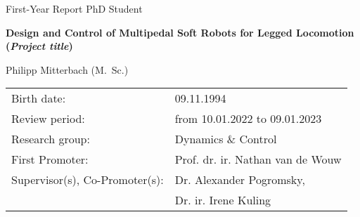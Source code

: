 \tikzexternaldisable
{}	
\tikzexternalenable


\vspace*{20mm}

\sffamily


\begin{center}
    \LARGE
    First-Year Report PhD Student \\
\end{center}

\vspace{15mm}

\begin{center}
    \LARGE
    \bfseries
    Design and Control of Multipedal Soft Robots for Legged Locomotion \\
    \mdseries 
    (\textit{Project title})
\end{center}

\vspace{3mm}

%	

\vspace{15mm}

\mdseries
\LARGE
\begin{center}  
Philipp Mitterbach (M.~Sc.)

\end{center}

\vspace{15mm}

\large
\noindent
\begin{tabular}{l l}
  Birth date: & 09.11.1994 \\
  Review period:  & from 10.01.2022 to 09.01.2023 \\
  Research group: & Dynamics \& Control \\
  First Promoter: & Prof. dr. ir. Nathan van de Wouw \\
  Supervisor(s), Co-Promoter(s):
  & Dr. Alexander Pogromsky, \\ & Dr. ir. Irene Kuling  \\
\end{tabular}

